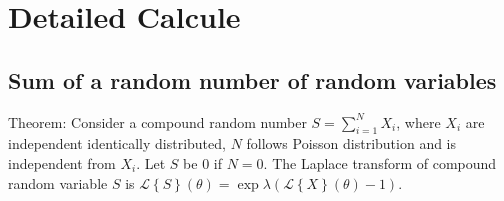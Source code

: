 \chapter{Detailed Calcule} 
\section*{Sum of a random number of random variables}
\label{annexe:laplace-transform-compound-RV}
Theorem: Consider a compound random number $S=\sum_{i=1}^{N} X_i$, where $X_i$ are independent identically distributed, $N$ follows Poisson distribution and is independent from $X_i$. Let $S$ be $0$ if $N=0$. The Laplace transform of compound random variable $S$ is $\mathcal{L} \left\lbrace S \right\rbrace \left( \theta \right) = \exp{\lambda\left(  \mathcal{L} \left\lbrace X \right\rbrace \left( \theta \right) - 1\right) }$.


